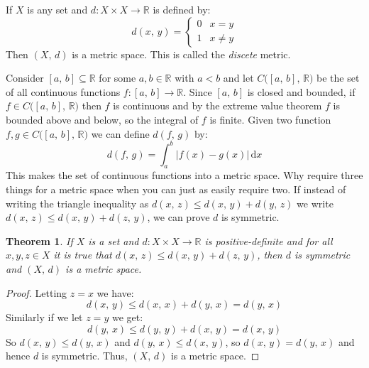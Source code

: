 \documentclass{article}
\theoremstyle{plain}
\newtheorem{theorem}{Theorem}[section]
\theoremstyle{normal}
\newenvironment{example}{%
    \pushQED{\qed}\renewcommand{\qedsymbol}{$\blacksquare$}\examplex%
}{%
    \popQED\endexamplex%
}
\begin{document}
        \begin{example}
            If $X$ is any set and $d:X\times{X}\rightarrow\mathbb{R}$ is defined
            by:
            \begin{equation}
                d(x,\,y)=
                \begin{cases}
                    0&x=y\\
                    1&x\ne{y}
                \end{cases}
            \end{equation}
            Then $(X,\,d)$ is a metric space. This is called the
            \textit{discete} metric.
        \end{example}
        \begin{example}
            Consider $[a,\,b]\subseteq\mathbb{R}$ for some $a,b\in\mathbb{R}$
            with $a<b$ and let $C\big([a,\,b],\,\mathbb{R}\big)$ be the set of
            all continuous functions $f:[a,\,b]\rightarrow\mathbb{R}$. Since
            $[a,\,b]$ is closed and bounded, if
            $f\in{C}\big([a,\,b],\,\mathbb{R}\big)$ then $f$ is continuous and
            by the extreme value theorem $f$ is bounded above and below, so the
            integral of $f$ is finite. Given two function
            $f,g\in{C}\big([a,\,b],\,\mathbb{R}\big)$ we can define
            $d(f,\,g)$ by:
            \begin{equation}
                d(f,\,g)=\int_{a}^{b}|f(x)-g(x)|\,\textrm{d}x
            \end{equation}
            This makes the set of continuous functions into a metric space.
        \end{example}
        Why require three things for a metric space when you can just as
        easily require two. If instead of writing the triangle inequality
        as $d(x,\,z)\leq{d}(x,\,y)+d(y,\,z)$ we write
        $d(x,\,z)\leq{d}(x,\,y)+d(z,\,y)$, we can prove $d$ is symmetric.
        \begin{theorem}
            If $X$ is a set and $d:X\times{X}\rightarrow\mathbb{R}$ is
            positive-definite and for all
            $x,y,z\in{X}$ it is true that
            $d(x,\,z)\leq{d}(x,\,y)+d(z,\,y)$, then $d$ is symmetric and
            $(X,\,d)$ is a metric space.
        \end{theorem}
        \begin{proof}
            Letting $z=x$ we have:
            \begin{equation}
                d(x,\,y)\leq{d}(x,\,x)+d(y,\,x)=d(y,\,x)
            \end{equation}
            Similarly if we let $z=y$ we get:
            \begin{equation}
                d(y,\,x)\leq{d}(y,\,y)+d(x,\,y)=d(x,\,y)
            \end{equation}
            So $d(x,\,y)\leq{d}(y,\,x)$ and $d(y,\,x)\leq{d}(x,\,y)$, so
            $d(x,\,y)=d(y,\,x)$ and hence
            $d$ is symmetric. Thus, $(X,\,d)$ is a metric space.
        \end{proof}
\end{document}
